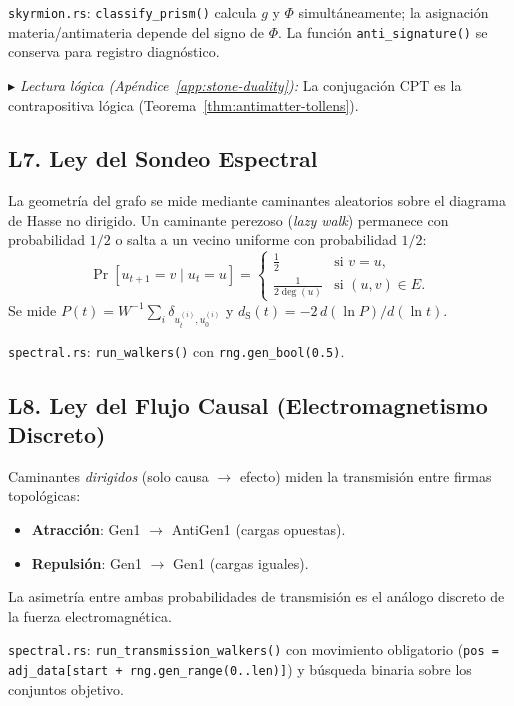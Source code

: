 \documentclass[11pt, a4paper, openany]{book}
\newcommand{\dS}{d_{\mathrm{S}}}
\newcommand{\stoneref}[1]{%
  \smallskip\noindent
  {\small\color{structure!70}\textit{$\blacktriangleright$ Lectura
  l\'ogica (Ap\'endice~\ref{app:stone-duality}):} #1}%
  \smallskip}
\begin{document}
\medskip\noindent
\texttt{skyrmion.rs}: \texttt{classify\_prism()} calcula $g$ y
$\Phi$ simult\'aneamente; la asignaci\'on materia/antimateria
depende del signo de $\Phi$.  La funci\'on
\texttt{anti\_signature()} se conserva para registro diagn\'ostico.

\stoneref{La conjugaci\'on CPT es la contrapositiva l\'ogica
(Teorema~\ref{thm:antimatter-tollens}).}

\subsection*{L7. Ley del Sondeo Espectral}
\label{law:spectral-probe}

La geometr\'ia del grafo se mide mediante caminantes aleatorios
sobre el diagrama de Hasse no dirigido. Un caminante perezoso
(\emph{lazy walk}) permanece con probabilidad $1/2$ o salta a un
vecino uniforme con probabilidad $1/2$:
\begin{equation}
  \Pr[u_{t+1} = v \mid u_t = u] =
  \begin{cases}
    \frac{1}{2} & \text{si } v = u,\\[4pt]
    \frac{1}{2\deg(u)} & \text{si } (u,v) \in E.
  \end{cases}
  \label{eq:law-lazy}
\end{equation}
Se mide $P(t) = W^{-1}\sum_i \delta_{u_t^{(i)}, u_0^{(i)}}$ y
$\dS(t) = -2\,d(\ln P)/d(\ln t)$.

\medskip\noindent
\texttt{spectral.rs}: \texttt{run\_walkers()} con
\texttt{rng.gen\_bool(0.5)}.

\subsection*{L8. Ley del Flujo Causal (Electromagnetismo Discreto)}
\label{law:causal-flux}

Caminantes \emph{dirigidos} (solo causa $\to$ efecto) miden la
transmisi\'on entre firmas topol\'ogicas:
\begin{itemize}
  \item \textbf{Atracci\'on}: Gen1 $\to$ AntiGen1 (cargas opuestas).
  \item \textbf{Repulsi\'on}: Gen1 $\to$ Gen1 (cargas iguales).
\end{itemize}
La asimetr\'ia entre ambas probabilidades de transmisi\'on es
el an\'alogo discreto de la fuerza electromagn\'etica.

\medskip\noindent
\texttt{spectral.rs}: \texttt{run\_transmission\_walkers()}
con movimiento obligatorio (\texttt{pos = adj\_data[start +
rng.gen\_range(0..len)]}) y b\'usqueda binaria sobre los
conjuntos objetivo.
\end{document}
